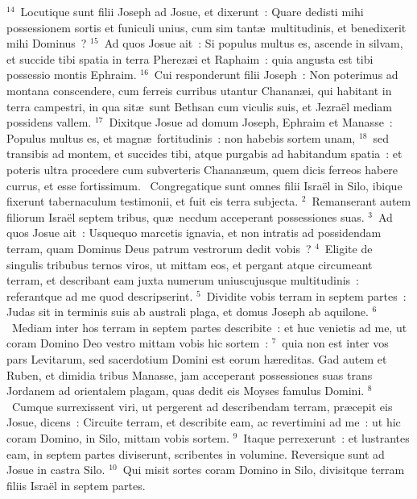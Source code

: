 ${}^{14}$~Locutique sunt filii Joseph ad Josue, et dixerunt~: Quare dedisti mihi possessionem sortis et funiculi unius, cum sim tant\ae\ multitudinis, et benedixerit mihi Dominus~?
${}^{15}$~Ad quos Josue ait~: Si populus multus es, ascende in silvam, et succide tibi spatia in terra Pherez\ae i et Raphaim~: quia angusta est tibi possessio montis Ephraim.
${}^{16}$~Cui responderunt filii Joseph~: Non poterimus ad montana conscendere, cum ferreis curribus utantur Chanan\ae i, qui habitant in terra campestri, in qua sit\ae\ sunt Bethsan cum viculis suis, et Jezra\"el mediam possidens vallem.
${}^{17}$~Dixitque Josue ad domum Joseph, Ephraim et Manasse~: Populus multus es, et magn\ae\ fortitudinis~: non habebis sortem unam,
${}^{18}$~sed transibis ad montem, et succides tibi, atque purgabis ad habitandum spatia~: et poteris ultra procedere cum subverteris Chanan\ae um, quem dicis ferreos habere currus, et esse fortissimum.
~\lettrine[lines=10,image=true,loversize=0.05,lraise=-0.03]{C}{}ongregatique sunt omnes filii Isra\"el in Silo, ibique fixerunt tabernaculum testimonii, et fuit eis terra subjecta.
${}^{2}$~Remanserant autem filiorum Isra\"el septem tribus, qu\ae\ necdum acceperant possessiones suas.
${}^{3}$~Ad quos Josue ait~: Usquequo marcetis ignavia, et non intratis ad possidendam terram, quam Dominus Deus patrum vestrorum dedit vobis~?
${}^{4}$~Eligite de singulis tribubus ternos viros, ut mittam eos, et pergant atque circumeant terram, et describant eam juxta numerum uniuscujusque multitudinis~: referantque ad me quod descripserint.
${}^{5}$~Dividite vobis terram in septem partes~: Judas sit in terminis suis ab australi plaga, et domus Joseph ab aquilone.
${}^{6}$~Mediam inter hos terram in septem partes describite~: et huc venietis ad me, ut coram Domino Deo vestro mittam vobis hic sortem~:
${}^{7}$~quia non est inter vos pars Levitarum, sed sacerdotium Domini est eorum h\ae reditas. Gad autem et Ruben, et dimidia tribus Manasse, jam acceperant possessiones suas trans Jordanem ad orientalem plagam, quas dedit eis Moyses famulus Domini.
${}^{8}$~Cumque surrexissent viri, ut pergerent ad describendam terram, pr\ae cepit eis Josue, dicens~: Circuite terram, et describite eam, ac revertimini ad me~: ut hic coram Domino, in Silo, mittam vobis sortem.
${}^{9}$~Itaque perrexerunt~: et lustrantes eam, in septem partes diviserunt, scribentes in volumine. Reversique sunt ad Josue in castra Silo.
${}^{10}$~Qui misit sortes coram Domino in Silo, divisitque terram filiis Isra\"el in septem partes.


